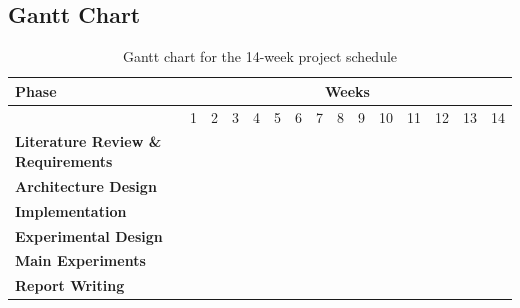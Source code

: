 \documentclass[12pt]{article}
\begin{document}
\subsection{Gantt Chart} \label{app:gantt}
\begin{table}[h!]
\centering
\small
\setlength{\tabcolsep}{3pt}
\renewcommand{\arraystretch}{1.7}

\newcommand{\ganttcell}{\cellcolor{gray!40}}

\begin{tabular}{|p{10cm}|*{14}{c|}}
\hline
\textbf{Phase} & \multicolumn{14}{c|}{\textbf{Weeks}} \\ \hline
 & 1 & 2 & 3 & 4 & 5 & 6 & 7 & 8 & 9 & 10 & 11 & 12 & 13 & 14 \\ \hline
\textbf{Literature Review \& Requirements}
  & \ganttcell & \ganttcell & \ganttcell & \ganttcell &  &  &  &  &  &  &  &  &  &  \\ \hline
\textbf{Architecture Design}
  &  &  &  &  & \ganttcell & \ganttcell &  &  &  &  &  &  &  &  \\ \hline
\textbf{Implementation}
  &  &  &  &  &  &  & \ganttcell & \ganttcell & \ganttcell &  &  &  &  &  \\ \hline
\textbf{Experimental Design}
  &  &  &  &  &  &  &  &  &  & \ganttcell &  &  &  &  \\ \hline
\textbf{Main Experiments}
  &  &  &  &  &  &  &  &  &  &  & \ganttcell & \ganttcell &  &  \\ \hline
\textbf{Report Writing}
  &  &  &  &  &  &  &  &  &  &  &  &  & \ganttcell & \ganttcell \\ \hline
\end{tabular}
\caption{Gantt chart for the 14-week project schedule}
\label{tab:gantt}
\end{table}
\end{document}
